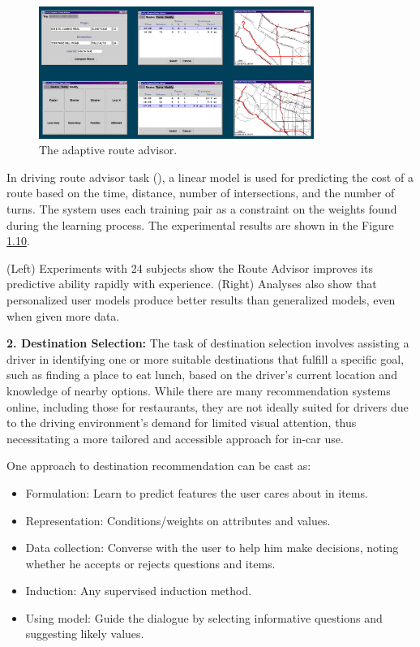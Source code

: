 \documentclass[
  letterpaper,
  DIV=11,
  numbers=noendperiod,
  oneside]{scrreprt}
\theoremstyle{remark}
\begin{document}
\begin{figure}

{\centering \includegraphics[width=0.8\textwidth,height=\textheight]{Figures/example-1.png}

}

\caption{The adaptive route advisor.}

\end{figure}%

In driving route advisor task (), a linear model is used for predicting the
cost of a route based on the time, distance, number of intersections,
and the number of turns. The system uses each training pair as a
constraint on the weights found during the learning process. The
experimental results are shown in the Figure \hyperref[fig:exp-2]{1.10}.

(Left) Experiments with 24 subjects show the Route Advisor improves its
predictive ability rapidly with experience. (Right) Analyses also show
that personalized user models produce better results than generalized
models, even when given more data.

\textbf{2. Destination Selection:} The task of destination selection
involves assisting a driver in identifying one or more suitable
destinations that fulfill a specific goal, such as finding a place to
eat lunch, based on the driver's current location and knowledge of
nearby options. While there are many recommendation systems online,
including those for restaurants, they are not ideally suited for drivers
due to the driving environment's demand for limited visual attention,
thus necessitating a more tailored and accessible approach for in-car
use.

One approach to destination recommendation can be cast as:

\begin{itemize}
\item
  Formulation: Learn to predict features the user cares about in items.
\item
  Representation: Conditions/weights on attributes and values.
\item
  Data collection: Converse with the user to help him make decisions,
  noting whether he accepts or rejects questions and items.
\item
  Induction: Any supervised induction method.
\item
  Using model: Guide the dialogue by selecting informative questions and
  suggesting likely values.
\end{itemize}
\end{document}
